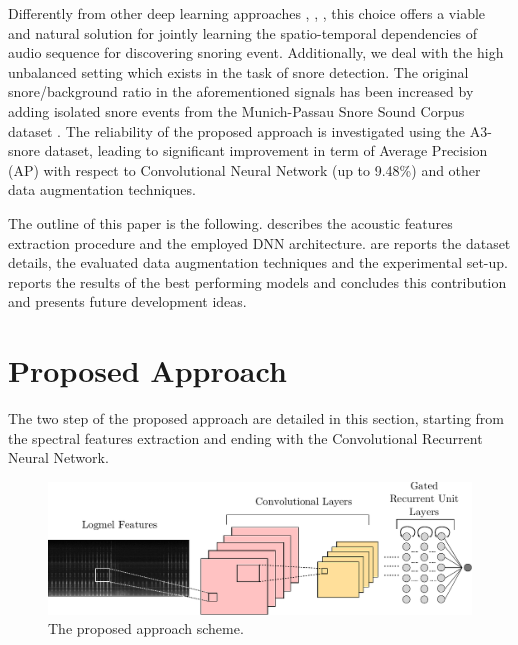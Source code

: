 Differently from other deep learning approaches \cite{amiriparian2017snore}, \cite{freitag2017end}, \cite{vesperini2018snore}, this choice offers a viable and natural solution for jointly learning the spatio-temporal dependencies of audio sequence for discovering snoring event. Additionally, we deal with the high unbalanced setting which exists in the task of snore detection. The original snore/background ratio in the aforementioned signals has been increased by adding isolated snore events from the Munich-Passau Snore Sound Corpus dataset \cite{ComParE2017}. The reliability of the proposed approach is investigated using the A3-snore dataset, leading to significant improvement in term of Average Precision (AP) with respect to Convolutional Neural Network (up to 9.48\%) and other data augmentation techniques. %

The outline of this paper is the following.  describes the acoustic features extraction procedure and the employed DNN architecture.  are reports the dataset details, the evaluated data augmentation techniques and the experimental set-up.  reports the results of the best performing models and  concludes this contribution and presents future development ideas.

\section{Proposed Approach}
\label{sec:proposed-approach}

The two step of the proposed approach are detailed in this section, starting from the spectral features extraction and ending with the Convolutional Recurrent Neural Network.

\begin{figure}[t]
	\centering
	\includegraphics[width=\columnwidth]{img/snore_detection_4.pdf}
	\caption{The proposed approach scheme.}\label{fig:overall}
\end{figure}

